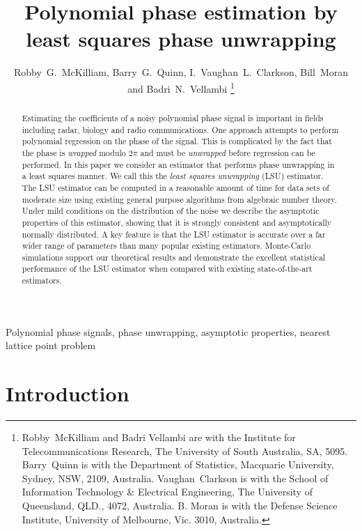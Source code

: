 \documentclass[journal]{IEEEtran}
\title{Polynomial phase estimation by least squares phase unwrapping}
\author{Robby~G.~McKilliam, Barry~G.~Quinn, I.~Vaughan~L.~Clarkson, Bill~Moran and Badri~N.~Vellambi%
    \thanks{%
Robby~McKilliam and Badri Vellambi are with the Institute for Telecommunications Research, The University of South Australia, SA, 5095.  Barry~Quinn is with the Department of Statistics, Macquarie University, Sydney, NSW, 2109, Australia.   Vaughan~Clarkson is with the School of Information Technology \& Electrical Engineering, The University of Queensland, QLD., 4072, Australia.  B. Moran is with the Defense Science Institute, University of Melbourne, Vic. 3010, Australia.}}
\begin{document}
 
\maketitle

\begin{abstract}
Estimating the coefficients of a noisy polynomial phase signal is important in fields including radar, biology and radio communications. One approach attempts to perform polynomial regression on the phase of the signal.  This is complicated by the fact that the phase is \emph{wrapped} modulo $2\pi$ and must be \emph{unwrapped} before regression can be performed.  In this paper we consider an estimator that performs phase unwrapping in a least squares manner.  We call this the \emph{least squares unwrapping} (LSU) estimator.  The LSU estimator can be computed in a reasonable amount of time for data sets of moderate size using existing general purpose algorithms from algebraic number theory.  Under mild conditions on the distribution of the noise we describe the asymptotic properties of this estimator, showing that it is strongly consistent and asymptotically normally distributed.  %
A key feature is that the LSU estimator is accurate over a far wider range of parameters than many popular existing estimators.  Monte-Carlo simulations support our theoretical results and demonstrate the excellent statistical performance of the LSU estimator when compared with existing state-of-the-art estimators.
\end{abstract}

\begin{keywords}
Polynomial phase signals, phase unwrapping, asymptotic properties, nearest lattice point problem
\end{keywords}
 
% 

\section{Introduction} \label{intro}
\end{document}
